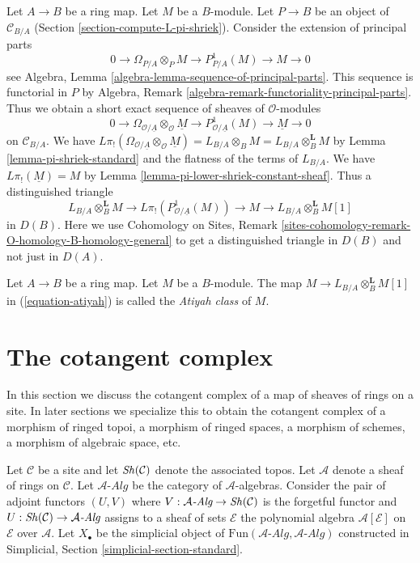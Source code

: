 \noindent
Let $A \to B$ be a ring map. Let $M$ be a $B$-module.
Let $P \to B$ be an object of $\mathcal{C}_{B/A}$
(Section \ref{section-compute-L-pi-shriek}).
Consider the extension of principal parts
$$
0 \to \Omega_{P/A} \otimes_P M \to P^1_{P/A}(M) \to M \to 0
$$
see Algebra, Lemma \ref{algebra-lemma-sequence-of-principal-parts}.
This sequence is functorial in $P$ by
Algebra, Remark \ref{algebra-remark-functoriality-principal-parts}.
Thus we obtain a short exact sequence of sheaves of $\mathcal{O}$-modules
$$
0 \to \Omega_{\mathcal{O}/\underline{A}} \otimes_\mathcal{O} \underline{M} \to
P^1_{\mathcal{O}/\underline{A}}(M) \to \underline{M} \to 0
$$
on $\mathcal{C}_{B/A}$. We have
$L\pi_!(\Omega_{\mathcal{O}/\underline{A}} \otimes_\mathcal{O} \underline{M})
= L_{B/A} \otimes_B M = L_{B/A} \otimes_B^\mathbf{L} M$
by Lemma \ref{lemma-pi-shriek-standard} and the flatness of
the terms of $L_{B/A}$.
We have $L\pi_!(\underline{M}) = M$ by
Lemma \ref{lemma-pi-lower-shriek-constant-sheaf}.
Thus a distinguished triangle
\begin{equation}
\label{equation-atiyah}
L_{B/A} \otimes_B^\mathbf{L} M \to
L\pi_!\left(P^1_{\mathcal{O}/\underline{A}}(M)\right) \to M
\to L_{B/A} \otimes_B^\mathbf{L} M [1]
\end{equation}
in $D(B)$. Here we use Cohomology on Sites, Remark
\ref{sites-cohomology-remark-O-homology-B-homology-general}
to get a distinguished triangle in $D(B)$ and not just in $D(A)$.

\begin{definition}
\label{definition-atiyah-class}
Let $A \to B$ be a ring map. Let $M$ be a $B$-module.
The map $M \to L_{B/A} \otimes_B^\mathbf{L} M[1]$
in (\ref{equation-atiyah}) is called the {\it Atiyah class} of $M$.
\end{definition}




\section{The cotangent complex}
\label{section-cotangent-complex}

\noindent
In this section we discuss the cotangent complex of a map of sheaves
of rings on a site. In later sections we specialize this to obtain
the cotangent complex of a morphism of ringed topoi, a morphism of
ringed spaces, a morphism of schemes, a morphism of algebraic space, etc.

\medskip\noindent
Let $\mathcal{C}$ be a site and let $\mathop{\mathit{Sh}}\nolimits(\mathcal{C})$ denote the
associated topos. Let $\mathcal{A}$ denote a sheaf of rings
on $\mathcal{C}$. Let $\mathcal{A}\textit{-Alg}$ be the category of
$\mathcal{A}$-algebras. Consider the pair of adjoint functors $(U, V)$ where
$V : \mathcal{A}\textit{-Alg} \to \mathop{\mathit{Sh}}\nolimits(\mathcal{C})$ is the forgetful functor and
$U : \mathop{\mathit{Sh}}\nolimits(\mathcal{C}) \to \mathcal{A}\textit{-Alg}$ assigns to a sheaf of sets
$\mathcal{E}$ the polynomial algebra $\mathcal{A}[\mathcal{E}]$ on
$\mathcal{E}$ over $\mathcal{A}$.
Let $X_\bullet$ be the simplicial object of
$\text{Fun}(\mathcal{A}\textit{-Alg}, \mathcal{A}\textit{-Alg})$
constructed in
Simplicial, Section \ref{simplicial-section-standard}.

